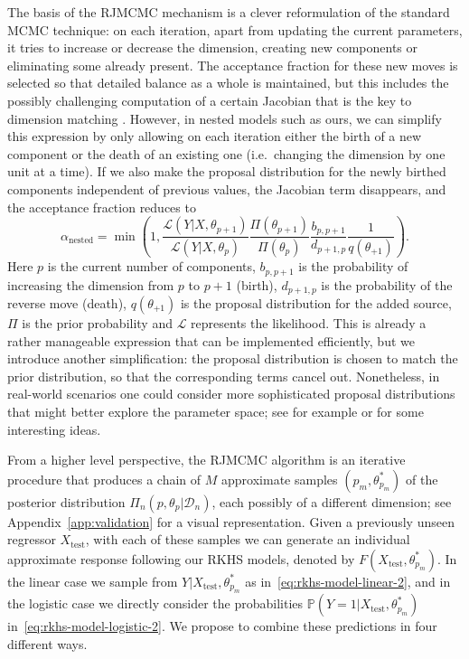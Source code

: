 \documentclass{article}
\numberwithin{equation}{section}
\theoremstyle{plain}
\theoremstyle{definition}
\begin{document}
The basis of the RJMCMC mechanism is a clever reformulation of the standard MCMC technique: on each iteration, apart from updating the current parameters, it tries to increase or decrease the dimension, creating new components or eliminating some already present. The acceptance fraction for these new moves is selected so that detailed balance as a whole is maintained, but this includes the possibly challenging computation of a certain Jacobian that is the key to dimension matching \citep{green1995reversible}. However, in nested models such as ours, we can simplify this expression by only allowing on each iteration either the birth of a new component or the death of an existing one (i.e.~changing the dimension by one unit at a time). If we also make the proposal distribution for the newly birthed components independent of previous values, the Jacobian term disappears, and the acceptance fraction reduces to \citep{brooks2003efficient}
\[
  \alpha_\text{nested} = \min\left(1, \frac{\mathcal{L}(Y | X, \theta_{p+1})}{\mathcal{L}(Y| X, \theta_p)}\frac{\Pi(\theta_{p+1})}{\Pi(\theta_p)}\frac{b_{p, p+1}}{d_{p+1, p}}\frac{1}{q(\theta_{+1})}\right).
\]
Here \(p\) is the current number of components, \(b_{p, p+1}\) is the probability of increasing the dimension from \(p\) to \(p+1\) (birth), \(d_{p+1, p}\) is the probability of the reverse move (death), \(q(\theta_{+1})\) is the proposal distribution for the added source, \(\Pi\) is the prior probability and \(\mathcal L\) represents the likelihood. This is already a rather manageable expression that can be implemented efficiently, but we introduce another simplification: the proposal distribution is chosen to match the prior distribution, so that the corresponding terms cancel out. Nonetheless, in real-world scenarios one could consider more sophisticated proposal distributions that might better explore the parameter space; see for example \citet{davies2023transport} or \citet{korsakova2024neural} for some interesting ideas.

From a higher level perspective, the RJMCMC algorithm is an iterative procedure that produces a chain of \(M\) approximate samples \((p_m, \theta^*_{p_m})\) of the posterior distribution \(\Pi_n(p, \theta_p| \mathcal D_n)\), each possibly of a different dimension; see Appendix~\ref{app:validation} for a visual representation. Given a previously unseen regressor \(X_{\text{test}}\), with each of these samples we can generate an individual approximate response following our RKHS models, denoted by \(F(X_{\text{test}}, \theta^*_{p_m})\). In the linear case we sample from \(Y | X_{\text{test}}, \theta^*_{p_m}\) as in~\eqref{eq:rkhs-model-linear-2}, and in the logistic case we directly consider the probabilities \(\mathbb{P}(Y=1|X_{\text{test}},\theta^*_{p_m})\) in~\eqref{eq:rkhs-model-logistic-2}. We propose to combine these predictions in four different ways.
\end{document}
